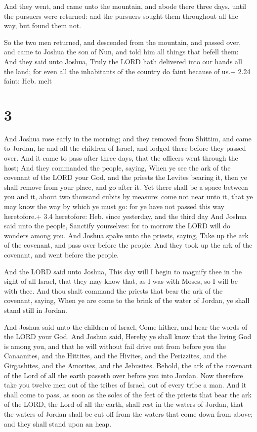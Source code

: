  And they went, and came unto the mountain, and abode there
three days, until the pursuers were returned: and the pursuers sought
them throughout all the way, but found them not.

 So the two men returned, and descended from the
mountain, and passed over, and came to Joshua the son of Nun, and told
him all things that befell them:  And they said unto
Joshua, Truly the LORD hath delivered into our hands all the land; for
even all the inhabitants of the country do faint because of us.+ 2.24
faint: Heb. melt

\hypertarget{section-2}{%
\section{3}\label{section-2}}

 And Joshua rose early in the morning; and they removed from
Shittim, and came to Jordan, he and all the children of Israel, and
lodged there before they passed over.  And it came to pass
after three days, that the officers went through the host; 
And they commanded the people, saying, When ye see the ark of the
covenant of the LORD your God, and the priests the Levites bearing it,
then ye shall remove from your place, and go after it.  Yet
there shall be a space between you and it, about two thousand cubits by
measure: come not near unto it, that ye may know the way by which ye
must go: for ye have not passed this way heretofore.+ 3.4 heretofore:
Heb. since yesterday, and the third day  And Joshua said
unto the people, Sanctify yourselves: for to morrow the LORD will do
wonders among you.  And Joshua spake unto the priests,
saying, Take up the ark of the covenant, and pass over before the
people. And they took up the ark of the covenant, and went before the
people.

 And the LORD said unto Joshua, This day will I begin to
magnify thee in the sight of all Israel, that they may know that, as I
was with Moses, so I will be with thee.  And thou shalt
command the priests that bear the ark of the covenant, saying, When ye
are come to the brink of the water of Jordan, ye shall stand still in
Jordan.

 And Joshua said unto the children of Israel, Come hither,
and hear the words of the LORD your God.  And Joshua said,
Hereby ye shall know that the living God is among you, and that he will
without fail drive out from before you the Canaanites, and the Hittites,
and the Hivites, and the Perizzites, and the Girgashites, and the
Amorites, and the Jebusites.  Behold, the ark of the
covenant of the Lord of all the earth passeth over before you into
Jordan.  Now therefore take you twelve men out of the
tribes of Israel, out of every tribe a man.  And it shall
come to pass, as soon as the soles of the feet of the priests that bear
the ark of the LORD, the Lord of all the earth, shall rest in the waters
of Jordan, that the waters of Jordan shall be cut off from the waters
that come down from above; and they shall stand upon an heap.

